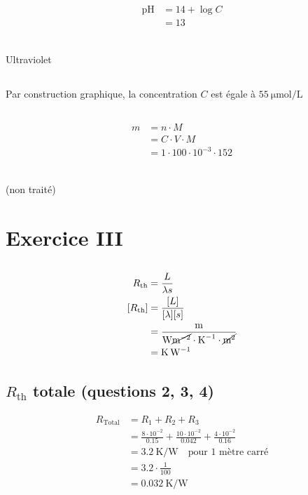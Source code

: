 \documentclass{article}
\begin{document}
\begin{align*}
	\text{pH} &=  14 + \log C \\
	&= 13 \\
\end{align*}

\subsection{}
Ultraviolet

\subsection{}
Par construction graphique, la concentration $C$ est égale à $\SI{55}{\micro\mol\per\liter}$

\subsection{}
\begin{align*}
	m &= n \cdot M \\
	&= C \cdot V \cdot M \\
	&= 1 \cdot 100 \cdot 10^{-3} \cdot 152 \\
\end{align*}

\subsection{}
(non traité)

\section{Exercice III}

\subsection{}

\begin{align*}
	R_{\text{th}} &= \frac{L}{\lambda s} \\
	[R_{\text{th}}] &= \frac{[L]}{[\lambda][s]} \\
                 	&= \frac{\text{m}}{\text{W} \cancel{\text{m}^{-2}} \cdot \text{K}^{-1} \cdot \cancel{\text{m}^2}} \\
			&= \si{\kelvin\per\watt}  \\
\end{align*}

\subsection{$R_{\text{th}}$ totale (questions 2, 3, 4)}
\begin{align*}
	R_{\text{Total}} &= R_1 + R_2 + R_3 \\
	&= \frac{8 \cdot 10^{-2}}{0.15} + \frac{10 \cdot 10^{-2}}{0.042} + \frac{4 \cdot 10^{-2}}{0.16} \\
	&= \SI{3.2}{\kelvin\per\watt} \quad\text{pour 1 mètre carré} \\
	&=  3.2 \cdot \frac{1}{100}\\
	&= \SI{0.032}{\kelvin\per\watt} \\
\end{align*}
\end{document}

